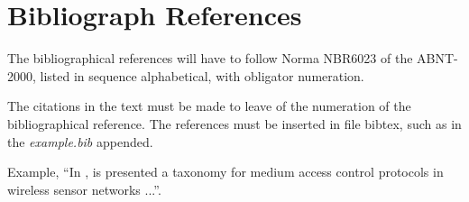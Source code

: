 \documentclass[10pt]{article}
\begin{document}
\section{Bibliograph References}

The bibliographical references will have to follow Norma NBR6023 of
the ABNT-2000, listed in sequence alphabetical, with obligator
numeration. 

The citations in the text must be made to leave of the numeration of
the bibliographical reference. The references must be inserted in file
bibtex, such as in the {\em example.bib} appended. 

 Example, ``In \cite{Correia}, is presented a taxonomy for medium
access control protocols in wireless sensor networks ...''.


\end{document}
